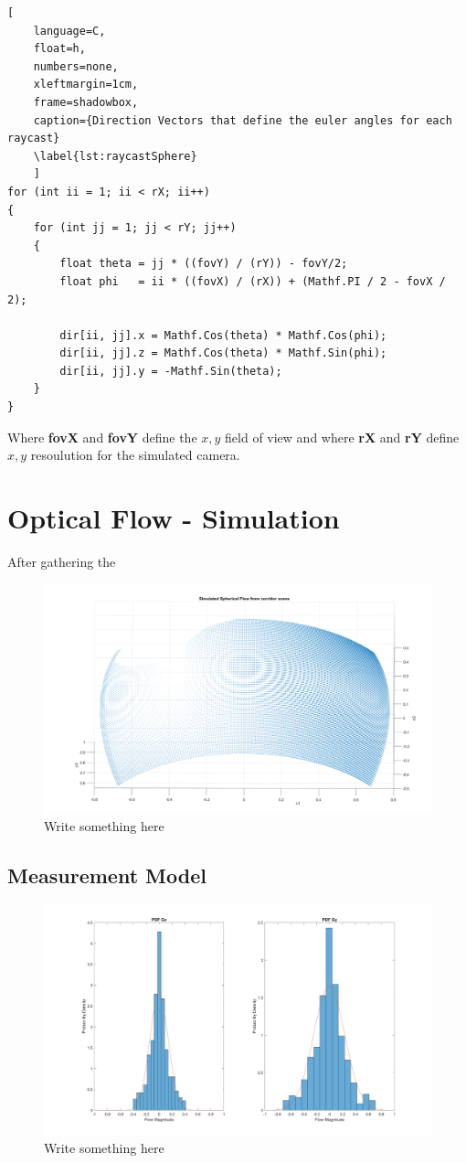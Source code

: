 \documentclass{UoNMCHA}
\numberwithin{equation}{section}
\begin{document}
\begin{lstlisting}[
    language=C,
	float=h,
	numbers=none,
    xleftmargin=1cm,
    frame=shadowbox,
	caption={Direction Vectors that define the euler angles for each raycast}
	\label{lst:raycastSphere}
	]
for (int ii = 1; ii < rX; ii++)
{
	for (int jj = 1; jj < rY; jj++)
	{
		float theta = jj * ((fovY) / (rY)) - fovY/2;
		float phi   = ii * ((fovX) / (rX)) + (Mathf.PI / 2 - fovX / 2);

		dir[ii, jj].x = Mathf.Cos(theta) * Mathf.Cos(phi);
		dir[ii, jj].z = Mathf.Cos(theta) * Mathf.Sin(phi);
		dir[ii, jj].y = -Mathf.Sin(theta);
	}
}
\end{lstlisting}
Where \textbf{fovX} and \textbf{fovY} define the $x, y$ field of view and where \textbf{rX} and \textbf{rY} define $x, y$ resoulution for the simulated camera. 
\newpage
\section{Optical Flow - Simulation}
After gathering the 

\begin{figure}[ht]
    \begin{center}
        \includegraphics[width=.6\linewidth]{Figures/SphericalFlowResultsExample}
        \caption{Write something here}
        \label{fig:Unit_Movement}
    \end{center}
\end{figure}

\subsection{Measurement Model}
\begin{figure}[ht]
    \begin{center}
        \includegraphics[width=.6\linewidth]{Figures/Matlab/GoPro_Noise_PDF}
        \caption{Write something here}
        \label{fig:GoPro_Noise_PDF}
    \end{center}
\end{figure}
\end{document}
